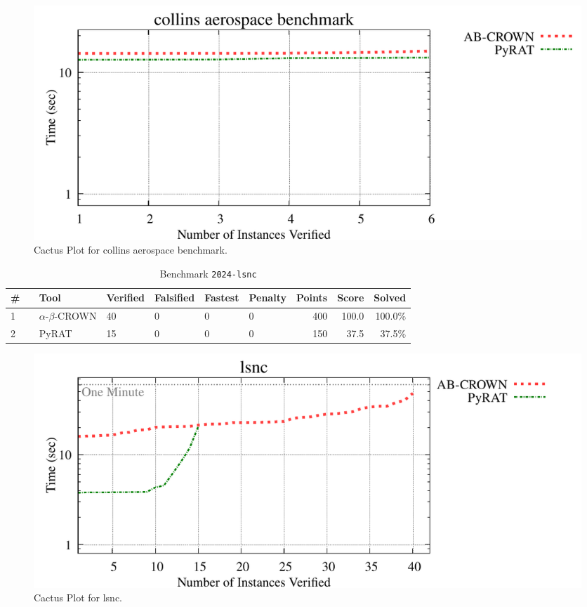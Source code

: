 \begin{figure}[h]
\centerline{\includegraphics[width=\textwidth]{cactus/2024_collins_aerospace_benchmark.pdf}}
\caption{Cactus Plot for collins aerospace benchmark.}
\label{fig:quantPic}
\end{figure}


\clearpage

\begin{table}[h]
\begin{center}
\caption{Benchmark \texttt{2024-lsnc}} \label{tab:cat_{cat}}
{\setlength{\tabcolsep}{2pt}
\begin{tabular}[h]{@{}llllllrrr@{}}
\toprule
\textbf{\# ~} & \textbf{Tool} & \textbf{Verified} & \textbf{Falsified} & \textbf{Fastest} & \textbf{Penalty} & \textbf{Points} & \textbf{Score} & \textbf{Solved}\\
\midrule
1 & $\alpha$-$\beta$-CROWN & 40 & 0 & 0 & 0 & 400 & 100.0 & 100.0\% \\
2 & PyRAT & 15 & 0 & 0 & 0 & 150 & 37.5 & 37.5\% \\
\bottomrule
\end{tabular}
}
\end{center}
\end{table}



\begin{figure}[h]
\centerline{\includegraphics[width=\textwidth]{cactus/2024_lsnc.pdf}}
\caption{Cactus Plot for lsnc.}
\label{fig:quantPic}
\end{figure}


